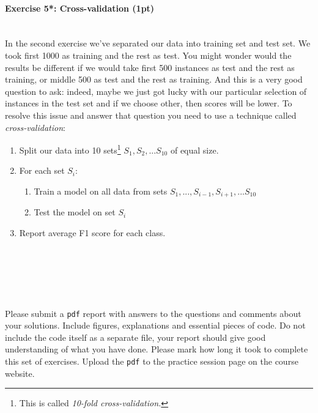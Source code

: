 \documentclass[a4paper,11pt]{article}
\newenvironment{exercise}[3]{\paragraph{Exercise #1: #2 (#3pt)}\ \\}{
\medskip}
\begin{document}
\begin{exercise}{5*}{Cross-validation}{1}
In the second exercise we've separated our data into training set and test set. We took first 1000 as training and the rest as test. You might wonder would the results be different if we would take first 500 instances as test and the rest as training, or middle 500 as test and the rest as training. And this is a very good question to ask: indeed, maybe we just got lucky with our particular selection of instances in the test set and if we choose other, then scores will be lower. To resolve this issue and answer that question you need to use a technique called \emph{cross-validation}:
\begin{enumerate}
	\item Split our data into 10 sets\footnote{This is called \emph{10-fold cross-validation.}} $S_1, S_2, ... S_{10}$ of equal size.
	\item For each set $S_i$:
	\begin{enumerate}
		\item Train a model on all data from sets $S_1, ..., S_{i-1}, S_{i+1}, ... S_{10}$
		\item Test the model on set $S_i$
	\end{enumerate}
	\item Report average F1 score for each class.
\end{enumerate}
\end{exercise}
\ \\
\ \\
\ \\
\ \\
\ \\
Please submit a \texttt{pdf} report with answers to the questions and comments about your solutions. Include figures, explanations and essential pieces of code. Do not include the code itself as a separate file, your report should give good understanding of what you have done. Please mark how long it took to complete this set of exercises. Upload the \texttt{pdf} to the practice session page on the course website.
\end{document}
